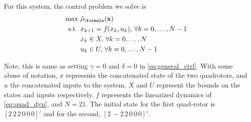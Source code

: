For this system, the control problem we solve is
\begin{subequations}
\label{eq:atc_ctrl}
\begin{align}
\text{max } & \srob_{\formula}(\sstraj) \\ %
\text{s.t. } & x_{k+1} = f(x_k,u_k), \, \forall k=0,\dotsc,N-1 \\
 & x_k \in X, \, \forall k=0,\dotsc,N \\
 & u_k \in U, \, \forall k=0,\dotsc,N-1 
\end{align}
\end{subequations}

Note, this is same as setting $\gamma=0$ and $\delta=0$ in \eqref{eq:general_ctrl}. With some abuse of notation, $x$ represents the concatenated state of the two quadrotors, and $u$ the concatenated inputs to the system. $X$ and $U$ represent the bounds on the states and inputs respectively. $f$ represents the linearized dynamics of \eqref{eq:quad_dyn}, and $N=21$. The initial state for the first quad-rotor is $[2\,2\,2\,0\,0\,0]'$ and for the second, $[2 \, -2 \, 2 \,0 \,0 \,0]'$.


